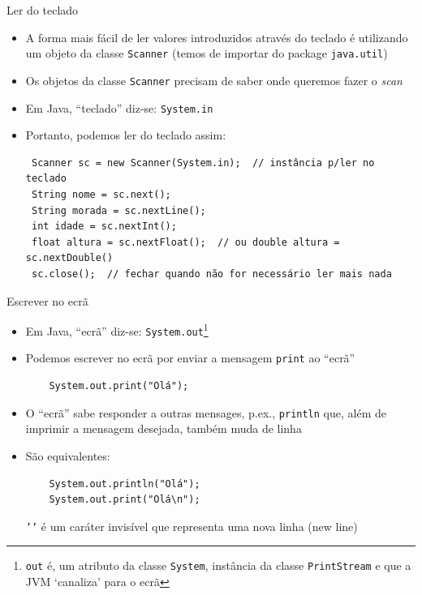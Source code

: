 \documentclass[portuguese, aspectratio=169, xcolor=table]{beamer}
\begin{document}
\begin{frame}[fragile]{Ler do teclado}
\begin{itemize}
    \item A forma mais fácil de ler valores introduzidos através do teclado é utilizando um objeto da classe \texttt{Scanner} (temos de importar do package \texttt{java.util})
    \item Os objetos da classe \texttt{Scanner} precisam de saber onde queremos fazer o \textit{scan}
    \item Em Java, ``teclado'' diz-se: \texttt{System.in}
    \item Portanto, podemos ler do teclado assim:
\begin{verbatim}
 Scanner sc = new Scanner(System.in);  // instância p/ler no teclado
 String nome = sc.next();
 String morada = sc.nextLine();
 int idade = sc.nextInt();
 float altura = sc.nextFloat();  // ou double altura = sc.nextDouble()
 sc.close();  // fechar quando não for necessário ler mais nada
\end{verbatim}
\end{itemize}
\end{frame}

\begin{frame}[fragile]{Escrever no ecrã}
\begin{itemize}
    \item Em Java, ``ecrã'' diz-se: \texttt{System.out}\footnote{\texttt{out} é, um atributo da classe \texttt{System}, instância da classe \texttt{PrintStream} e que a JVM `canaliza' para o ecrã}
    \item Podemos escrever no ecrã por enviar a mensagem \texttt{print} ao ``ecrã''
\begin{verbatim}
    System.out.print("Olá");
\end{verbatim}
\item O ``ecrã'' sabe responder a outras mensages, p.ex., \texttt{println} que, além de imprimir a mensagem desejada, também muda de linha
\item São equivalentes:
\begin{verbatim}
    System.out.println("Olá");
    System.out.print("Olá\n");
\end{verbatim}
\texttt{'\n'} é um caráter invisível que representa uma nova linha (new line)
\end{itemize}
\end{frame}
\end{document}
